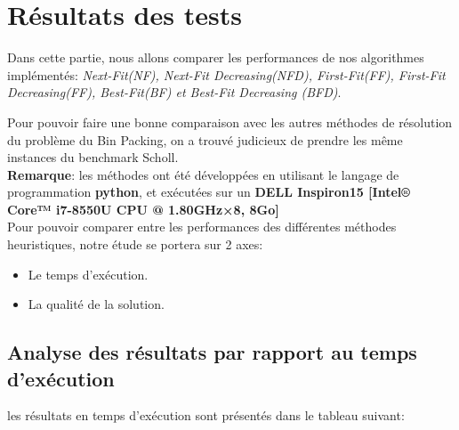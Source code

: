 \documentclass[class=article, crop=false]{standalone}
\begin{document}
\section{Résultats des tests}
Dans cette partie, nous allons comparer les performances de nos algorithmes implémentés:
\emph{Next-Fit(NF), Next-Fit Decreasing(NFD), First-Fit(FF), First-Fit Decreasing(\emph{FF}), Best-Fit(BF) et Best-Fit Decreasing (BFD)}. 

Pour pouvoir faire une bonne comparaison avec les autres méthodes de résolution du problème du Bin Packing,
on a trouvé judicieux de prendre les même instances du benchmark Scholl. \\

\textbf{Remarque}: les méthodes ont été développées en utilisant le langage de programmation \textbf{python}, et exécutées sur un \textbf{DELL Inspiron15 [Intel® Core™ i7-8550U CPU @ 1.80GHz×8, 8Go]}\\

Pour pouvoir comparer entre les performances des différentes méthodes heuristiques, notre étude se portera sur 2 axes:
\begin{itemize}
    \item Le temps d’exécution.
    \item La qualité de la solution.
\end{itemize}

\subsection{Analyse des résultats par rapport au temps d’exécution}
les résultats en temps d'exécution sont présentés dans le tableau suivant:  
\end{document}

